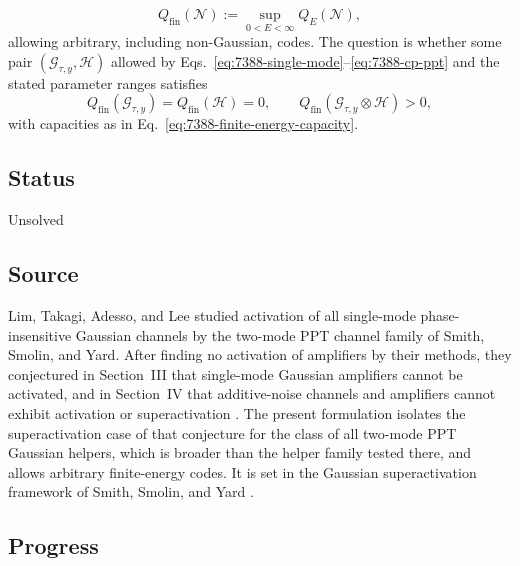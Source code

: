 \begin{equation}
 Q_{\mathrm{fin}}(\mathcal N):=\sup_{0<E<\infty}Q_E(\mathcal N),
 \label{eq:7388-finite-energy-capacity}
\end{equation}
allowing arbitrary, including non-Gaussian, codes. The question is whether some pair $(\mathcal G_{\tau,y},\mathcal H)$ allowed by Eqs.~\eqref{eq:7388-single-mode}--\eqref{eq:7388-cp-ppt} and the stated parameter ranges satisfies
\begin{equation}
 Q_{\mathrm{fin}}(\mathcal G_{\tau,y})=Q_{\mathrm{fin}}(\mathcal H)=0,
 \qquad
 Q_{\mathrm{fin}}(\mathcal G_{\tau,y}\otimes\mathcal H)>0,
 \label{eq:7388-superactivation}
\end{equation}
with capacities as in Eq.~\eqref{eq:7388-finite-energy-capacity}.

\subsection*{Status}

Unsolved

\subsection*{Source}

Lim, Takagi, Adesso, and Lee studied activation of all single-mode phase-insensitive Gaussian channels by the two-mode PPT channel family of Smith, Smolin, and Yard. After finding no activation of amplifiers by their methods, they conjectured in Section~III that single-mode Gaussian amplifiers cannot be activated, and in Section~IV that additive-noise channels and amplifiers cannot exhibit activation or superactivation . The present formulation isolates the superactivation case of that conjecture for the class of all two-mode PPT Gaussian helpers, which is broader than the helper family tested there, and allows arbitrary finite-energy codes. It is set in the Gaussian superactivation framework of Smith, Smolin, and Yard .

\subsection*{Progress}

